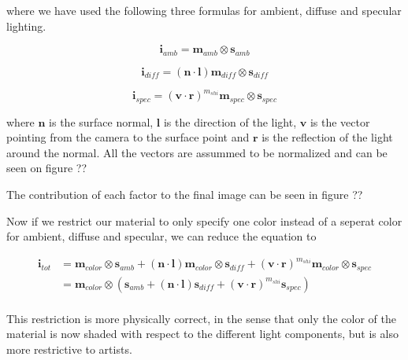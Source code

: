 where we have used the following three formulas for ambient, diffuse
and specular lighting.

\begin{displaymath}
  \mathbf{i}_{amb} = \mathbf{m}_{amb} \otimes \mathbf{s}_{amb} 
\end{displaymath}

\begin{displaymath}
  \mathbf{i}_{diff} = (\mathbf{n} \cdot \mathbf{l}) \mathbf{m}_{diff} \otimes \mathbf{s}_{diff} 
\end{displaymath}

\begin{displaymath}
  \mathbf{i}_{spec} = (\mathbf{v} \cdot \mathbf{r})^{m_{shi}} \mathbf{m}_{spec} \otimes \mathbf{s}_{spec} 
\end{displaymath}

where $\mathbf{n}$ is the surface normal, $\mathbf{l}$ is the
direction of the light, $\mathbf{v}$ is the vector pointing from the
camera to the surface point and $\mathbf{r}$ is the reflection of the
light around the normal. All the vectors are assummed to be normalized
and can be seen on figure ??


The contribution of each factor to the final image can be seen in figure ??

Now if we restrict our material to only specify one color instead of a
seperat color for ambient, diffuse and specular, we can reduce the
equation to 

\begin{displaymath}
  \begin{array}{rl}
    \mathbf{i}_{tot} &= \mathbf{m}_{color} \otimes \mathbf{s}_{amb} + (\mathbf{n} \cdot
    \mathbf{l}) \mathbf{m}_{color} \otimes \mathbf{s}_{diff} +
    (\mathbf{v} \cdot \mathbf{r})^{m_{shi}} \mathbf{m}_{color} \otimes
    \mathbf{s}_{spec} \\
    &= \mathbf{m}_{color} \otimes (\mathbf{s}_{amb} + (\mathbf{n} \cdot
    \mathbf{l}) \mathbf{s}_{diff} + (\mathbf{v} \cdot
    \mathbf{r})^{m_{shi}} \mathbf{s}_{spec}) \\
  \end{array}
\end{displaymath}

This restriction is more physically correct, in the sense that only
the color of the material is now shaded with respect to the different
light components, but is also more restrictive to artists.\\

